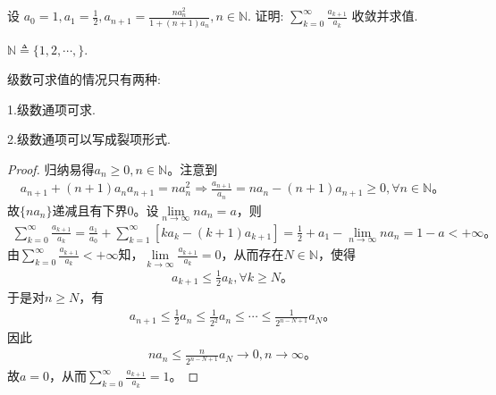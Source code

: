 \documentclass[../../main.tex]{subfiles}%
\begin{document}
\begin{example}
设 \( a_0 = 1, a_1 = \frac{1}{2}, a_{n+1} = \frac{n a_n^2}{1 + (n + 1) a_n}, n \in \mathbb{N} \). 证明: \( \sum_{k=0}^{\infty} \frac{a_{k+1}}{a_k} \) 收敛并求值.
\end{example}
\begin{remark}
$\mathbb{N}\triangleq \{1,2,\cdots,\}$.
\end{remark}
\begin{remark}
级数可求值的情况只有两种:

1.级数通项可求.

2.级数通项可以写成裂项形式.
\end{remark}
\begin{proof}
归纳易得$a_n\geqslant 0,n\in \mathbb{N}$。注意到
\begin{align*}
a_{n+1}+\left( n+1 \right) a_na_{n+1}=na_{n}^{2}\Longrightarrow \frac{a_{n+1}}{a_n}=na_n-\left( n+1 \right) a_{n+1}\geqslant 0,\forall n\in \mathbb{N}。
\end{align*}
故$\{ na_n \}$递减且有下界$0$。设$\lim\limits_{n\rightarrow \infty}na_n=a$，则
\begin{align*}
\sum_{k=0}^{\infty}{\frac{a_{k+1}}{a_k}}=\frac{a_1}{a_0}+\sum_{k=1}^{\infty}{\left[ ka_k-\left( k+1 \right) a_{k+1} \right]}=\frac{1}{2}+a_1-\lim\limits_{n\rightarrow \infty}na_n=1-a<+\infty。
\end{align*}
由$\sum_{k=0}^{\infty}{\frac{a_{k+1}}{a_k}}<+\infty$知，$\lim\limits_{k\rightarrow \infty}\frac{a_{k+1}}{a_k}=0$，从而存在$N\in \mathbb{N}$，使得
\begin{align*}
a_{k+1}\leqslant \frac{1}{2}a_k,\forall k\geqslant N。
\end{align*}
于是对$n\geqslant N$，有
\begin{align*}
a_{n+1}\leqslant \frac{1}{2}a_n\leqslant \frac{1}{2^2}a_n\leqslant \cdots \leqslant \frac{1}{2^{n-N+1}}a_N。
\end{align*}
因此
\begin{align*}
na_n\leqslant \frac{n}{2^{n-N+1}}a_N\rightarrow 0,n\rightarrow \infty。
\end{align*}
故$a=0$，从而$\sum_{k=0}^{\infty}{\frac{a_{k+1}}{a_k}}=1$。
\end{proof}
\end{document}
